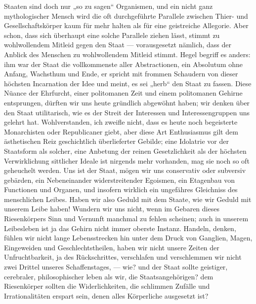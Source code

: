 Staaten sind doch nur „so zu sagen“ Organismen, und ein nicht ganz mythologischer Mensch wird die oft durchgeführte Parallele zwischen Thier- und Gesellschaftskörper kaum für mehr halten als für eine geistreiche Allegorie. Aber schon, dass sich überhaupt eine solche Parallele ziehen lässt, stimmt zu wohlwollendem Mitleid gegen den Staat — vorausgesetzt nämlich, dass der Anblick des Menschen zu wohlwollendem Mitleid stimmt. Hegel begriff es anders: ihm war der Staat die vollkommenste aller Abstractionen, ein Absolutum ohne Anfang, Wachsthum und Ende, er spricht mit frommen Schaudern von dieser höchsten Incarnation der Idee und meint, es sei „herb“ den Staat zu fassen. Diese Nüance der Ehrfurcht, einer politomanen Zeit und einem politomanen Gehirne entsprungen, dürften wir uns heute gründlich abgewöhnt haben; wir denken über den Staat utilitarisch, wie es der Streit der Interessen und Interessengruppen uns gelehrt hat. Wohlverstanden, ich zweifle nicht, dass es heute noch begeisterte Monarchisten oder Republicaner giebt, aber diese Art Enthusiasmus gilt dem ästhetischen Reiz geschichtlich überlieferter Gebilde; eine Idolatrie vor der Staatsform als solcher, eine Anbetung der reinen Gesetzlichkeit als der höchsten Verwirklichung sittlicher Ideale ist nirgends mehr vorhanden, mag sie noch so oft geheuchelt werden. Uns ist der Staat, mögen wir uns conservativ oder subversiv gebärden, ein Nebeneinander widerstreitender Egoismen, ein Etagenbau von Functionen und Organen, und insofern wirklich ein ungefähres Gleichniss des menschlichen Leibes. Haben wir also Geduld mit dem Staate, wie wir Geduld mit unserem Leibe haben! Wundern wir uns nicht, wenn im Gebaren dieses Riesenkörpers Sinn und Vernunft manchmal zu fehlen scheinen; auch in unserem Leibesleben ist ja das Gehirn nicht immer oberste Instanz. Handeln, denken, fühlen wir nicht lange Lebensstrecken hin unter dem Druck von Ganglien, Magen, Eingeweiden und Geschlechtstheilen, haben wir nicht unsere Zeiten der Unfruchtbarkeit, ja des Rückschrittes, verschlafen und verschlemmen wir nicht zwei Drittel unseres Schaffenstages, — wie? und der Staat sollte geistiger, cerebraler, philosophischer leben als wir, die Staatsangehörigen? dem Riesenkörper sollten die Widerlichkeiten, die schlimmen Zufälle und Irrationalitäten erspart sein, denen alles Körperliche ausgesetzt ist?
\par

